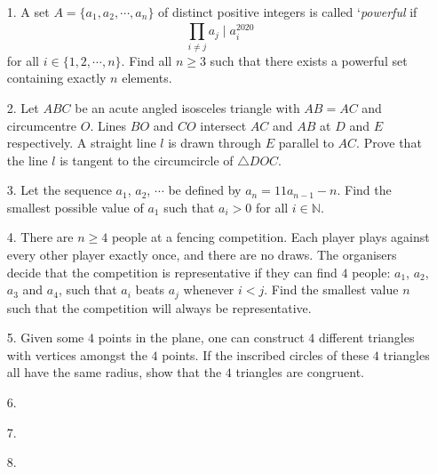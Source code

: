 \documentclass{article}
\begin{document}
\begin{enumerate}

\bigskip
\item[1.] %
A set $A = \{a_1, a_2, \cdots, a_n\}$ of distinct positive integers is called `\emph{powerful} if
\[ \prod_{i \neq j}^{}a_j \mid a_i^{2020} \]
for all $i \in \{1, 2, \cdots, n\}$.
Find all $n \ge 3$ such that there exists a powerful set containing exactly $n$ elements.


\medskip
\item[2.] %
Let $ABC$ be an acute angled isosceles triangle with $AB = AC$ and circumcentre $O$.
Lines $BO$ and $CO$ intersect $AC$ and $AB$ at $D$ and $E$ respectively.
A straight line $l$ is drawn through $E$ parallel to $AC$.
Prove that the line $l$ is tangent to the circumcircle of $\triangle DOC$.


\medskip
\item[3.] %
Let the sequence $a_1$, $a_2$, $\cdots$ be defined by $a_n = 11a_{n - 1} - n$.
Find the smallest possible value of $a_1$ such that $a_i > 0$ for all $i \in \mathbb{N}$.


\medskip
\item[4.] %
There are $n \ge 4$ people at a fencing competition.
Each player plays against every other player exactly once, and there are no draws.
The organisers decide that the competition is representative if they can find $4$ people: $a_1$, $a_2$, $a_3$ and $a_4$, such that $a_i$ beats $a_j$ whenever $i < j$.
Find the smallest value $n$ such that the competition will always be representative.


\medskip
\item[5.] %
Given some $4$ points in the plane, one can construct $4$ different triangles with vertices amongst the $4$ points. If the inscribed circles
of these $4$ triangles all have the same radius, show that the $4$ triangles are congruent. 


\medskip
\item[6.] %


\medskip
\item[7.] %


\medskip
\item[8.] %

\end{enumerate}
\end{document}
